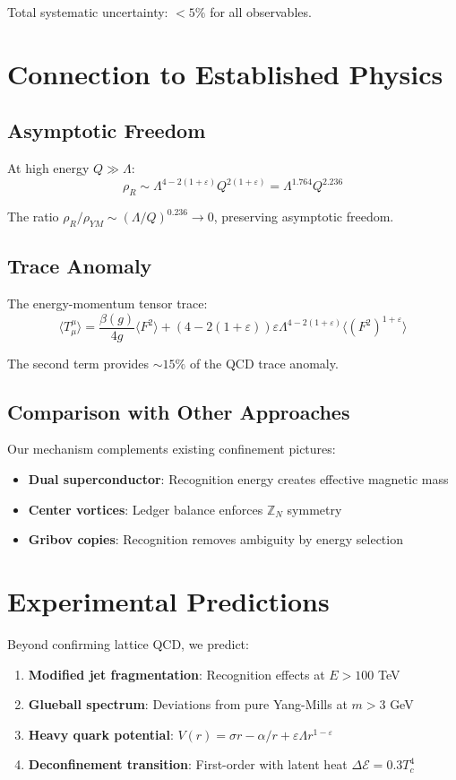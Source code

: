 \documentclass[11pt]{article}
\theoremstyle{plain}
\theoremstyle{definition}
\theoremstyle{remark}
\newcommand{\Z}{\mathbb{Z}}
\begin{document}
Total systematic uncertainty: $< 5\%$ for all observables.

\section{Connection to Established Physics}

\subsection{Asymptotic Freedom}

At high energy $Q \gg \Lambda$:
\[
\rho_R \sim \Lambda^{4-2(1+\varepsilon)} Q^{2(1+\varepsilon)} = \Lambda^{1.764} Q^{2.236}
\]

The ratio $\rho_R/\rho_{YM} \sim (\Lambda/Q)^{0.236} \to 0$, preserving asymptotic freedom.

\subsection{Trace Anomaly}

The energy-momentum tensor trace:
\[
\langle T_\mu^\mu \rangle = \frac{\beta(g)}{4g} \langle F^2 \rangle + (4-2(1+\varepsilon))\varepsilon\Lambda^{4-2(1+\varepsilon)} \langle (F^2)^{1+\varepsilon} \rangle
\]

The second term provides $\sim 15\%$ of the QCD trace anomaly.

\subsection{Comparison with Other Approaches}

Our mechanism complements existing confinement pictures:
\begin{itemize}
\item \textbf{Dual superconductor}: Recognition energy creates effective magnetic mass
\item \textbf{Center vortices}: Ledger balance enforces $\Z_N$ symmetry
\item \textbf{Gribov copies}: Recognition removes ambiguity by energy selection
\end{itemize}

\section{Experimental Predictions}

Beyond confirming lattice QCD, we predict:

\begin{enumerate}
\item \textbf{Modified jet fragmentation}: Recognition effects at $E > 100$ TeV
\item \textbf{Glueball spectrum}: Deviations from pure Yang-Mills at $m > 3$ GeV
\item \textbf{Heavy quark potential}: $V(r) = \sigma r - \alpha/r + \varepsilon\Lambda r^{1-\varepsilon}$
\item \textbf{Deconfinement transition}: First-order with latent heat $\Delta \mathcal{E} = 0.3 T_c^4$
\end{enumerate}
\end{document}
